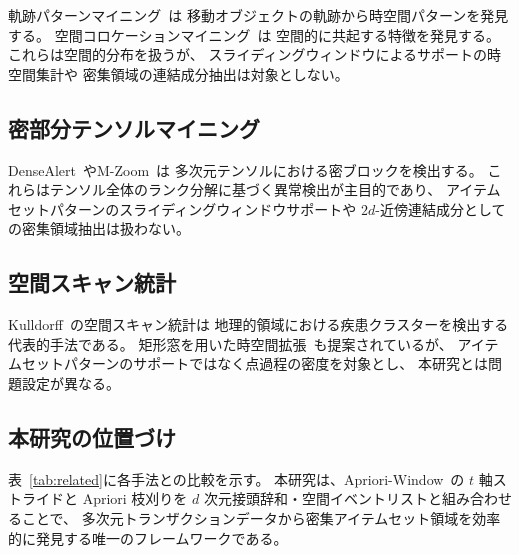 軌跡パターンマイニング~\cite{giannotti2007trajectory}は
移動オブジェクトの軌跡から時空間パターンを発見する。
空間コロケーションマイニング~\cite{shekhar2001colocation}は
空間的に共起する特徴を発見する。
これらは空間的分布を扱うが、
スライディングウィンドウによるサポートの時空間集計や
密集領域の連結成分抽出は対象としない。

\subsection{密部分テンソルマイニング}

DenseAlert~\cite{shin2017densealert}やM-Zoom~\cite{shin2018mzoom}は
多次元テンソルにおける密ブロックを検出する。
これらはテンソル全体のランク分解に基づく異常検出が主目的であり、
アイテムセットパターンのスライディングウィンドウサポートや
$2d$-近傍連結成分としての密集領域抽出は扱わない。

\subsection{空間スキャン統計}

Kulldorff~\cite{kulldorff1997spatial}の空間スキャン統計は
地理的領域における疾患クラスターを検出する代表的手法である。
矩形窓を用いた時空間拡張~\cite{kulldorff2001prospective}も提案されているが、
アイテムセットパターンのサポートではなく点過程の密度を対象とし、
本研究とは問題設定が異なる。

\subsection{本研究の位置づけ}

表~\ref{tab:related}に各手法との比較を示す。
本研究は、Apriori-Window~\cite{aprioriwindow}の $t$ 軸ストライドと Apriori 枝刈りを
$d$ 次元接頭辞和・空間イベントリストと組み合わせることで、
多次元トランザクションデータから密集アイテムセット領域を効率的に発見する唯一のフレームワークである。

